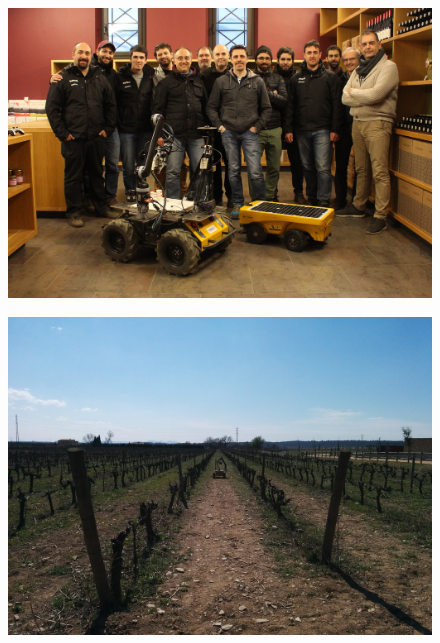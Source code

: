 
\begin{figure}
	\centering
	\includegraphics[width=1.1\textwidth]{Images/gruppo_tagliata.JPG}
\end{figure}
\begin{figure}
	\centering
	\includegraphics[width=1.1\textwidth]{Images/robot_solo.jpg}
\end{figure}
